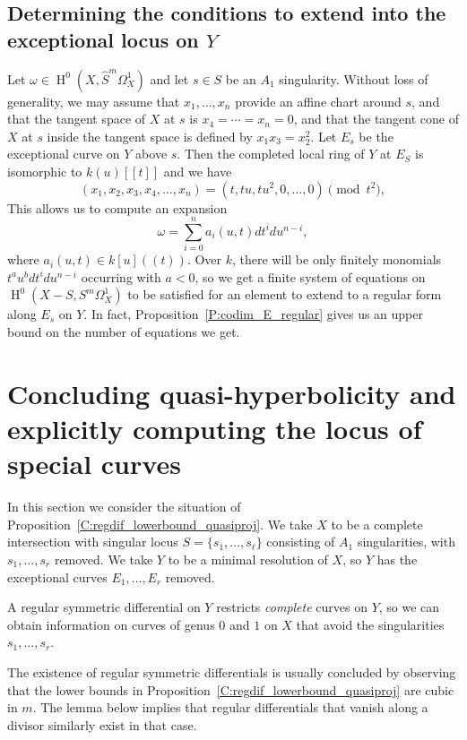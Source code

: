 \documentclass[12pt, reqno]{amsart}
\theoremstyle{definition}
\DeclareMathOperator{\HH}{H}
\numberwithin{equation}{section}
\numberwithin{table}{section}
\begin{document}
\subsection{Determining the conditions to extend into the exceptional locus on $Y$}
\label{s:conditions_to_extend_into_E}
Let $\omega\in \HH^0(X,\hat{S}^m\Omega^1_X)$ and let $s\in S$ be an $A_1$ singularity. Without loss of generality, we may assume that $x_1,\ldots,x_n$ provide an affine chart around $s$, and that the tangent space of $X$ at $s$ is $x_4=\cdots=x_n=0$, and that the tangent cone of $X$ at $s$ inside the tangent space is defined by $x_1x_3=x_2^2$. Let $E_s$ be the exceptional curve on $Y$ above $s$. Then the completed local ring of $Y$ at $E_S$ is isomorphic to $k(u)[[t]]$ and we have
\[(x_1,x_2,x_3,x_4,\ldots,x_n)=(t,tu,tu^2,0,\ldots,0)\pmod{t^2},\]
This allows us to compute an expansion
\[\omega=\sum_{i=0}^n a_i(u,t)dt^idu^{n-i},\]
where $a_i(u,t)\in k[u]((t))$. Over $k$, there will be only finitely monomials $t^au^bdt^idu^{n-i}$ occurring with $a<0$, so we get a finite system of equations on $\HH^0(X- S,S^m\Omega^1_X)$ to be satisfied for an element to extend to a regular form along $E_s$ on $Y$. In fact, Proposition~\ref{P:codim_E_regular} gives us an upper bound on the number of equations we get.


\section{Concluding quasi-hyperbolicity and explicitly computing the locus of special curves}
\label{s:resultants}

In this section we consider the situation of Proposition~\ref{C:regdif_lowerbound_quasiproj}. We take $X$ to be a complete intersection with singular locus $S=\{s_1,\ldots,s_\ell\}$ consisting of $A_1$ singularities, with $s_1,\ldots,s_r$ removed. We take $Y$ to be a minimal resolution of $X$, so $Y$ has the exceptional curves $E_1,\ldots,E_r$ removed.

A regular symmetric differential on $Y$ restricts \emph{complete} curves on $Y$, so we can obtain information on curves of genus $0$ and $1$ on $X$ that avoid the singularities $s_1,\ldots,s_r$.

The existence of regular symmetric differentials is usually concluded by observing that the lower bounds in Proposition~\ref{C:regdif_lowerbound_quasiproj} are cubic in $m$. The lemma below implies that regular differentials that vanish along a divisor similarly exist in that case.
\end{document}
